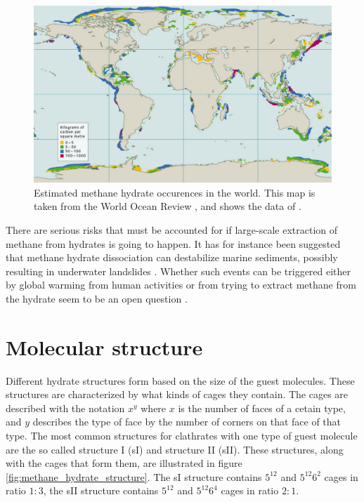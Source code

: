 \begin{figure}
\includegraphics[width=\textwidth]{../pictures/hydrate_map_nice.pdf}
\caption{Estimated methane hydrate occurences in the world. This map is taken from the World Ocean Review \cite{Bucker2014}, and shows the data of \citet{Wallmann2012}.}
\label{fig:hydrate_map}
\end{figure}

There are serious risks that must be accounted for if large-scale extraction of methane from hydrates is going to happen. It has for instance been suggested that methane hydrate dissociation can destabilize marine sediments, possibly resulting in underwater landslides \cite{Sultan2004379,Xu2006}. Whether such events can be triggered either by global warming from human activities or from trying to extract methane from the hydrate seem to be an open question \cite{Ning2012}.

\section{Molecular structure}
Different hydrate structures form based on the size of the guest molecules. These structures are characterized by what kinds of cages they contain. The cages are described with the notation $x^y$ where $x$ is the number of faces of a cetain type, and $y$ describes the type of face by the number of corners on that face of that type. The most common structures for clathrates with one type of guest molecule are the so called structure I (sI) and structure II (sII). These structures, along with the cages that form them, are illustrated in figure \ref{fig:methane_hydrate_structure}. The sI structure contains $5^{12}$ and $5^{12}6^2$ cages in ratio $1:3$, the sII structure contains $5^{12}$ and $5^{12}6^4$ cages in ratio $2:1$.  

